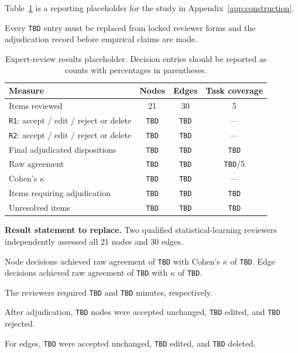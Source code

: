 Table~\ref{tab:graph-review-results-placeholder} is a reporting placeholder for the study in
Appendix~\ref{app:construction}.

Every \texttt{TBD} entry must be replaced from locked reviewer forms and the adjudication record before
empirical claims are made.

\begin{table}[h!]
\caption{Expert-review results placeholder. Decision entries should be reported as counts with percentages in parentheses.}
\label{tab:graph-review-results-placeholder}
\centering
\small
\begin{tabularx}{\linewidth}{>{\raggedright\arraybackslash}Xccc}
\toprule
\textbf{Measure} & \textbf{Nodes} & \textbf{Edges} & \textbf{Task coverage} \\
\midrule
Items reviewed & 21 & 30 & 5 \\
\texttt{R1}: accept / edit / reject or delete & \texttt{TBD} & \texttt{TBD} & --- \\
\texttt{R2}: accept / edit / reject or delete & \texttt{TBD} & \texttt{TBD} & --- \\
Final adjudicated dispositions & \texttt{TBD} & \texttt{TBD} & \texttt{TBD} \\
Raw agreement & \texttt{TBD} & \texttt{TBD} & \texttt{TBD}/5 \\
Cohen's $\kappa$ & \texttt{TBD} & \texttt{TBD} & --- \\
Items requiring adjudication & \texttt{TBD} & \texttt{TBD} & \texttt{TBD} \\
Unresolved items & \texttt{TBD} & \texttt{TBD} & \texttt{TBD} \\
\bottomrule
\end{tabularx}
\end{table}

\noindent\textbf{Result statement to replace.}
Two qualified statistical-learning reviewers independently assessed all 21 nodes and 30 edges.

Node decisions achieved raw agreement of \texttt{TBD} with Cohen's $\kappa$ of \texttt{TBD}. Edge
decisions achieved raw agreement of \texttt{TBD} with $\kappa$ of \texttt{TBD}.

The reviewers required \texttt{TBD} and \texttt{TBD} minutes, respectively.

After adjudication, \texttt{TBD} nodes were accepted unchanged, \texttt{TBD} edited, and \texttt{TBD}
rejected.

For edges, \texttt{TBD} were accepted unchanged, \texttt{TBD} edited, and \texttt{TBD} deleted.

